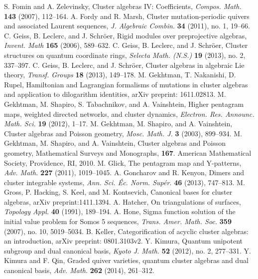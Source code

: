 \documentclass{amsart}
\theoremstyle{definition}
\theoremstyle{remark}
\numberwithin{equation}{section}
\begin{document}
\begin{thebibliography}{99}
	 S. Fomin and A. Zelevinsky, Cluster algebras IV: Coefficients, \textsl{Compos. Math.} \textbf{143} (2007), 112--164.
	 A. Fordy and R. Marsh, Cluster mutation-periodic quivers and associated Laurent sequences, \textsl{J. Algebraic Combin.} \textbf{34} (2011), no. 1, 19--66.
	 C. Geiss, B. Leclerc, and J. Schr\"oer, Rigid modules over preprojective algebras, \textsl{Invent. Math} \textbf{165} (2006), 589--632.
 	 C. Geiss, B. Leclerc, and J. Schr\"oer, Cluster structures on quantum coordinate rings, \textsl{Selecta Math. (N.S.)} \textbf{19} (2013), no. 2, 337--397.
  	 C. Geiss, B. Leclerc, and J. Schr\"oer, Cluster algebras in algebraic Lie theory, \textsl{Transf. Groups} \textbf{18} (2013), 149--178.
  	 M. Gekhtman, T. Nakanishi, D. Rupel, Hamiltonian and Lagrangian formalisms of mutations in cluster algebras and application to dilogarithm identities, arXiv preprint: 1611.02813.
	 M. Gekhtman, M. Shapiro, S. Tabachnikov, and A. Vainshtein, Higher pentagram maps, weighted directed networks, and cluster dynamics, \textsl{Electron. Res. Announc. Math. Sci.} \textbf{19} (2012), 1--17.
	 M. Gekhtman, M. Shapiro, and A. Vainshtein,  Cluster algebras and Poisson geometry, \textsl{Mosc. Math. J.} \textbf{3} (2003), 899--934.
  	 M. Gekhtman, M. Shapiro, and A. Vainshtein,  Cluster algebras and Poisson geometry, Mathematical Surveys and Monographs, \textbf{167}. American Mathematical Society, Providence, RI, 2010.
	 M. Glick, The pentagram map and Y-patterns, \textsl{Adv. Math.} \textbf{227} (2011), 1019--1045.
	 A. Goncharov and R. Kenyon, Dimers and cluster integrable systems, \textsl{Ann. Sci. \'Ec. Norm. Sup\'er.} \textbf{46} (2013), 747--813.
  	 M. Gross, P. Hacking, S. Keel, and M. Kontsevich, Canonical bases for cluster algebras, arXiv preprint:1411.1394.
	 A. Hatcher, On triangulations of surfaces, \textsl{Topology Appl.} \textbf{40} (1991), 189--194.
	 A. Hone, Sigma function solution of the initial value problem for Somos 5 sequences, \textsl{Trans. Amer. Math. Soc.} \textbf{359} (2007), no. 10, 5019--5034.
  	 B. Keller, Categorification of acyclic cluster algebras: an introduction, arXiv preprint: 0801.3103v2.
  	 Y. Kimura, Quantum unipotent subgroup and dual canonical basis, \textsl{Kyoto J. Math.} \textbf{52} (2012), no. 2, 277--331.
  	 Y. Kimura and F. Qin, Graded quiver varieties, quantum cluster algebras and dual canonical basis, \textsl{Adv. Math.} \textbf{262} (2014), 261--312.

\end{thebibliography}
\end{document}
